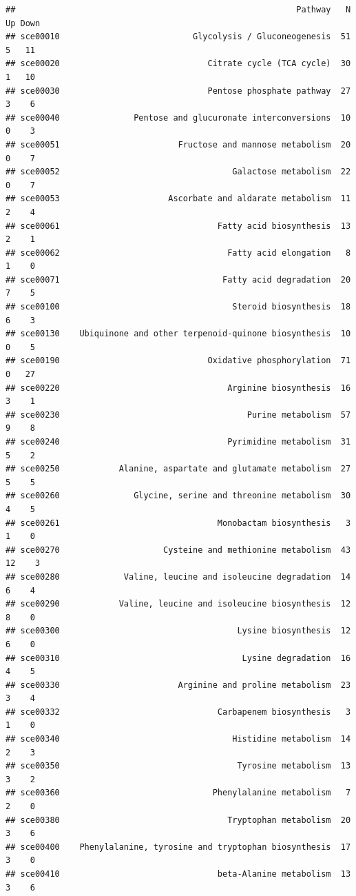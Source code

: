 \documentclass[
]{book}
\begin{document}
\begin{verbatim}
##                                                         Pathway   N Up Down
## sce00010                           Glycolysis / Gluconeogenesis  51  5   11
## sce00020                              Citrate cycle (TCA cycle)  30  1   10
## sce00030                              Pentose phosphate pathway  27  3    6
## sce00040               Pentose and glucuronate interconversions  10  0    3
## sce00051                        Fructose and mannose metabolism  20  0    7
## sce00052                                   Galactose metabolism  22  0    7
## sce00053                      Ascorbate and aldarate metabolism  11  2    4
## sce00061                                Fatty acid biosynthesis  13  2    1
## sce00062                                  Fatty acid elongation   8  1    0
## sce00071                                 Fatty acid degradation  20  7    5
## sce00100                                   Steroid biosynthesis  18  6    3
## sce00130    Ubiquinone and other terpenoid-quinone biosynthesis  10  0    5
## sce00190                              Oxidative phosphorylation  71  0   27
## sce00220                                  Arginine biosynthesis  16  3    1
## sce00230                                      Purine metabolism  57  9    8
## sce00240                                  Pyrimidine metabolism  31  5    2
## sce00250            Alanine, aspartate and glutamate metabolism  27  5    5
## sce00260               Glycine, serine and threonine metabolism  30  4    5
## sce00261                                Monobactam biosynthesis   3  1    0
## sce00270                     Cysteine and methionine metabolism  43 12    3
## sce00280             Valine, leucine and isoleucine degradation  14  6    4
## sce00290            Valine, leucine and isoleucine biosynthesis  12  8    0
## sce00300                                    Lysine biosynthesis  12  6    0
## sce00310                                     Lysine degradation  16  4    5
## sce00330                        Arginine and proline metabolism  23  3    4
## sce00332                                Carbapenem biosynthesis   3  1    0
## sce00340                                   Histidine metabolism  14  2    3
## sce00350                                    Tyrosine metabolism  13  3    2
## sce00360                               Phenylalanine metabolism   7  2    0
## sce00380                                  Tryptophan metabolism  20  3    6
## sce00400    Phenylalanine, tyrosine and tryptophan biosynthesis  17  3    0
## sce00410                                beta-Alanine metabolism  13  3    6

\end{verbatim}
\end{document}
